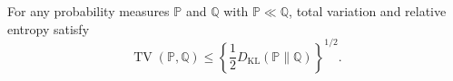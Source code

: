 For any probability measures \(\mathbb P\) and \(\mathbb Q\) with \(\mathbb P\ll\mathbb Q\), total variation and relative entropy satisfy
\[
 \operatorname{TV}(\mathbb P,\mathbb Q)
 \le\left\{\frac12D_{\mathrm{KL}}(\mathbb P\|\mathbb Q)\right\}^{1/2}.
\]